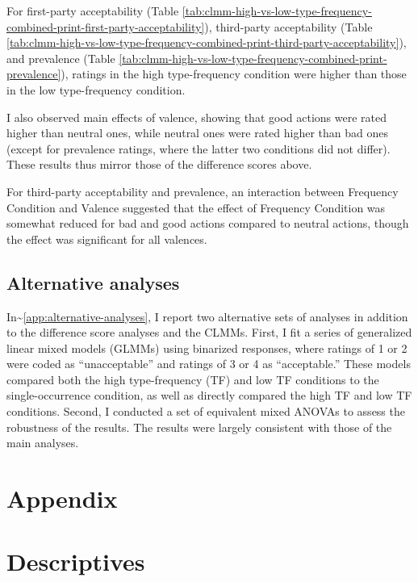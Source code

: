 \documentclass[
]{article}
\begin{document}
For first-party acceptability (Table \ref{tab:clmm-high-vs-low-type-frequency-combined-print-first-party-acceptability}), third-party acceptability (Table \ref{tab:clmm-high-vs-low-type-frequency-combined-print-third-party-acceptability}), and prevalence (Table \ref{tab:clmm-high-vs-low-type-frequency-combined-print-prevalence}), ratings in the high type-frequency condition were higher than those in the low type-frequency condition.

I also observed main effects of valence, showing that good actions were rated higher than neutral ones, while neutral ones were rated higher than bad ones (except for prevalence ratings, where the latter two conditions did not differ).
These results thus mirror those of the difference scores above.

For third-party acceptability and prevalence, an interaction between Frequency Condition and Valence suggested that the effect of Frequency Condition was somewhat reduced for bad and good actions compared to neutral actions, though the effect was significant for all valences.

\clearpage

\subsection{Alternative analyses}\label{alternative-analyses-1}

In\textasciitilde{}\ref{app:alternative-analyses}, I report two alternative sets of analyses in addition to the difference score analyses and the CLMMs. First, I fit a series of generalized linear mixed models (GLMMs) using binarized responses, where ratings of 1 or 2 were coded as ``unacceptable'' and ratings of 3 or 4 as ``acceptable.'' These models compared both the high type-frequency (TF) and low TF conditions to the single-occurrence condition, as well as directly compared the high TF and low TF conditions. Second, I conducted a set of equivalent mixed ANOVAs to assess the robustness of the results. The results were largely consistent with those of the main analyses.

\clearpage

\section{Appendix}\label{appendix-1}

\section{Descriptives}\label{descriptives-1}
\end{document}
